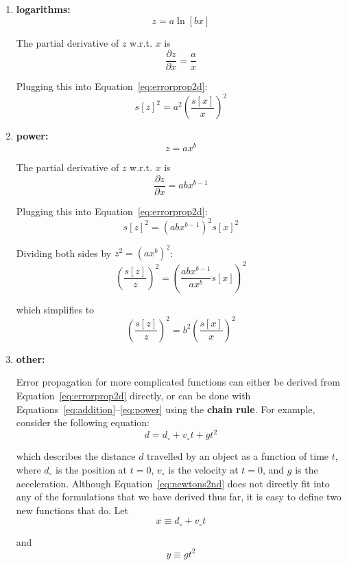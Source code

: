 \begin{enumerate}
\item{\bf logarithms:}
  \[
  z = a \ln[bx]
  \]

  The partial derivative of $z$ w.r.t. $x$ is
  \[
  \frac{\partial z}{\partial x} = \frac{a}{x}
  \]

  Plugging this into Equation~\ref{eq:errorprop2d}:
  \begin{equation}
    s[z]^2 = a^2 \left(\frac{s[x]}{x}\right)^2
    \label{eq:logarithms}
  \end{equation}

\item{\bf power:}
  \[
  z = a x^b
  \]

  The partial derivative of $z$ w.r.t. $x$ is
  \[
  \frac{\partial z}{\partial x} = ab x^{b-1}
  \]

  Plugging this into Equation~\ref{eq:errorprop2d}:
  \[
  s[z]^2 = \left(ab x^{b-1}\right)^2 s[x]^2
  \]

  Dividing both sides by $z^2 = \left(a x^b\right)^2$:
  \[
  \left(\frac{s[z]}{z}\right)^2 = \left(\frac{ab x^{b-1}}{a x^{b}}s[x]\right)^2 
  \]

  which simplifies to
  \begin{equation}
    \left(\frac{s[z]}{z}\right)^2 = b^2\left(\frac{s[x]}{x}\right)^2
    \label{eq:power}
  \end{equation}

\item{\bf other:}

  Error propagation for more complicated functions can either be derived
  from Equation~\ref{eq:errorprop2d} directly, or can be done with
  Equations~\ref{eq:addition}--\ref{eq:power} using the \textbf{chain
    rule}. For example, consider the following equation:
  \begin{equation}
    d = d_\circ + v_\circ t + g t^2
    \label{eq:newtons2nd}
  \end{equation}

  \noindent which describes the distance $d$ travelled by an object as a
  function of time $t$, where $d_\circ$ is the position at $t=0$,
  $v_\circ$ is the velocity at $t=0$, and $g$ is the acceleration.
  Although Equation~\ref{eq:newtons2nd} does not directly fit into any
  of the formulations that we have derived thus far, it is easy to
  define two new functions that do. Let
  \begin{equation}
    x \equiv d_\circ + v_\circ t
    \label{eq:xvt}
  \end{equation}

  \noindent and
  \begin{equation}
    y \equiv g t^2
    \label{eq:ygt2}
  \end{equation}


\end{enumerate}
